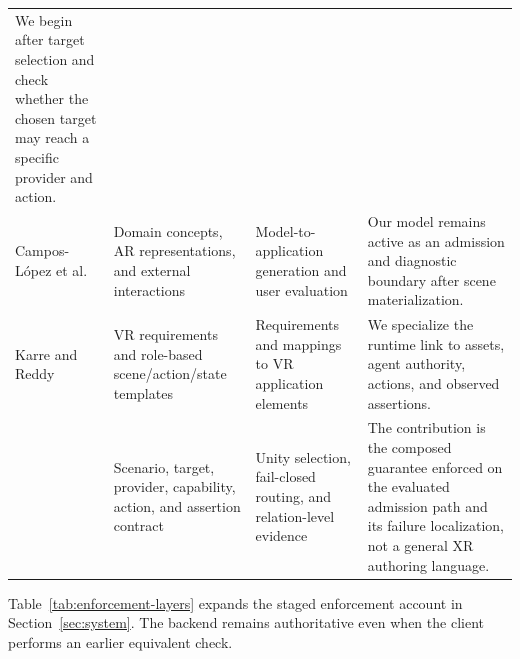 \begin{table}[!htbp]
\begin{tabular}{@{}p{}p{}p{}p{}@{}}
    We begin after target selection and check whether the chosen target may
    reach a specific provider and action. \\
    Campos-López et al.\ \cite{camposlopez2023mdear} &
    Domain concepts, AR representations, and external interactions &
    Model-to-application generation and user evaluation &
    Our model remains active as an admission and diagnostic boundary after
    scene materialization. \\
    Karre and Reddy \cite{karre2024vrrequirements} &
    VR requirements and role-based scene/action/state templates &
    Requirements and mappings to VR application elements &
    We specialize the runtime link to assets, agent authority, actions, and
    observed assertions. \\
    \systemname{} &
    Scenario, target, provider, capability, action, and assertion contract &
    Unity selection, fail-closed routing, and relation-level evidence &
    The contribution is the composed guarantee enforced on the evaluated
    admission path and its failure localization, not a general XR authoring
    language. \\
    \bottomrule
  \end{tabular}
\end{table}

Table~\ref{tab:enforcement-layers} expands the staged enforcement account in
Section~\ref{sec:system}. The backend remains authoritative even when the
client performs an earlier equivalent check.

